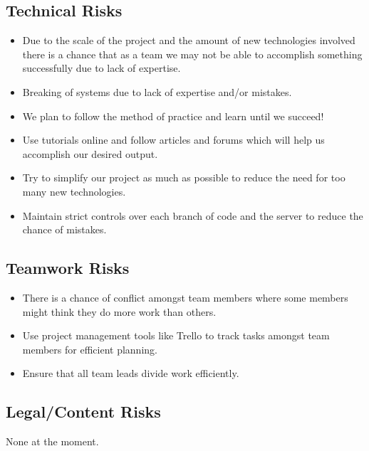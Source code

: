 \subsection{Technical Risks}
\begin{itemize}
\item Due to the scale of the project and the amount of new technologies involved there is a chance that as a team we may not be able to accomplish something successfully due to lack of expertise.
\item Breaking of systems due to lack of expertise and/or mistakes.
\end{itemize}

\begin{itemize}
\item We plan to follow the method of practice and learn until we succeed!
\item Use tutorials online and follow articles and forums which will help us accomplish our desired output.
\item Try to simplify our project as much as possible to reduce the need for too many new technologies.
\item Maintain strict controls over each branch of code and the server to reduce the chance of mistakes.
\end{itemize}

\subsection{Teamwork Risks}
\begin{itemize}
\item There is a chance of conflict amongst team members where some members might think they do more work than others.
\end{itemize}

\begin{itemize}
\item Use project management tools like Trello to track tasks amongst team members for efficient planning.
\item Ensure that all team leads divide work efficiently.
\end{itemize}

\subsection{Legal/Content Risks}
None at the moment.